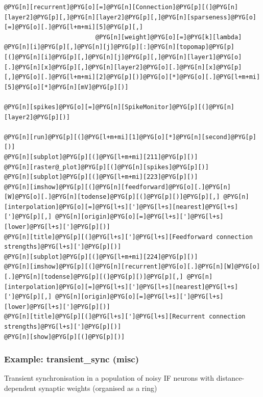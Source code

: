 \documentclass[letterpaper,10pt,english]{manual}
\begin{document}
\begin{Verbatim}[commandchars=@\[\]]
@PYG[n][recurrent]@PYG[o][=]@PYG[n][Connection]@PYG[p][(]@PYG[n][layer2]@PYG[p][,]@PYG[n][layer2]@PYG[p][,]@PYG[n][sparseness]@PYG[o][=]@PYG[o][.]@PYG[l+m+mi][5]@PYG[p][,]
                         @PYG[n][weight]@PYG[o][=]@PYG[k][lambda] @PYG[n][i]@PYG[p][,]@PYG[n][j]@PYG[p][:]@PYG[n][topomap]@PYG[p][(]@PYG[n][i]@PYG[p][,]@PYG[n][j]@PYG[p][,]@PYG[n][layer1]@PYG[o][.]@PYG[n][x]@PYG[p][,]@PYG[n][layer2]@PYG[o][.]@PYG[n][x]@PYG[p][,]@PYG[o][.]@PYG[l+m+mi][2]@PYG[p][)]@PYG[o][*]@PYG[o][.]@PYG[l+m+mi][5]@PYG[o][*]@PYG[n][mV]@PYG[p][)]

@PYG[n][spikes]@PYG[o][=]@PYG[n][SpikeMonitor]@PYG[p][(]@PYG[n][layer2]@PYG[p][)]

@PYG[n][run]@PYG[p][(]@PYG[l+m+mi][1]@PYG[o][*]@PYG[n][second]@PYG[p][)]
@PYG[n][subplot]@PYG[p][(]@PYG[l+m+mi][211]@PYG[p][)]
@PYG[n][raster@_plot]@PYG[p][(]@PYG[n][spikes]@PYG[p][)]
@PYG[n][subplot]@PYG[p][(]@PYG[l+m+mi][223]@PYG[p][)]
@PYG[n][imshow]@PYG[p][(]@PYG[n][feedforward]@PYG[o][.]@PYG[n][W]@PYG[o][.]@PYG[n][todense]@PYG[p][(]@PYG[p][)]@PYG[p][,] @PYG[n][interpolation]@PYG[o][=]@PYG[l+s][']@PYG[l+s][nearest]@PYG[l+s][']@PYG[p][,] @PYG[n][origin]@PYG[o][=]@PYG[l+s][']@PYG[l+s][lower]@PYG[l+s][']@PYG[p][)]
@PYG[n][title]@PYG[p][(]@PYG[l+s][']@PYG[l+s][Feedforward connection strengths]@PYG[l+s][']@PYG[p][)]
@PYG[n][subplot]@PYG[p][(]@PYG[l+m+mi][224]@PYG[p][)]
@PYG[n][imshow]@PYG[p][(]@PYG[n][recurrent]@PYG[o][.]@PYG[n][W]@PYG[o][.]@PYG[n][todense]@PYG[p][(]@PYG[p][)]@PYG[p][,] @PYG[n][interpolation]@PYG[o][=]@PYG[l+s][']@PYG[l+s][nearest]@PYG[l+s][']@PYG[p][,] @PYG[n][origin]@PYG[o][=]@PYG[l+s][']@PYG[l+s][lower]@PYG[l+s][']@PYG[p][)]
@PYG[n][title]@PYG[p][(]@PYG[l+s][']@PYG[l+s][Recurrent connection strengths]@PYG[l+s][']@PYG[p][)]
@PYG[n][show]@PYG[p][(]@PYG[p][)]
\end{Verbatim}

\resetcurrentobjects
\hypertarget{--doc-examples-misc_transient_sync}{}

\hypertarget{index-72}{}\subsubsection{Example: transient\_sync (misc)}

Transient synchronisation in a population of noisy IF neurons
with distance-dependent synaptic weights (organised as a ring)
\end{document}
